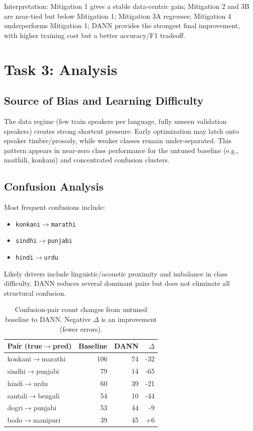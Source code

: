 \documentclass[11pt]{article}
\begin{document}
Interpretation: Mitigation 1 gives a stable data-centric gain; Mitigation 2 and 3B are near-tied but below Mitigation 1; Mitigation 3A regresses; Mitigation 4 underperforms Mitigation 1; DANN provides the strongest final improvement, with higher training cost but a better accuracy/F1 tradeoff.

\section{Task 3: Analysis}
\subsection{Source of Bias and Learning Difficulty}
The data regime (few train speakers per language, fully unseen validation speakers) creates strong shortcut pressure. Early optimization may latch onto speaker timbre/prosody, while weaker classes remain under-separated. This pattern appears in near-zero class performance for the untuned baseline (e.g., maithili, konkani) and concentrated confusion clusters.

\subsection{Confusion Analysis}
Most frequent confusions include:
\begin{itemize}
    \item \texttt{konkani$\rightarrow$marathi}
    \item \texttt{sindhi$\rightarrow$punjabi}
    \item \texttt{hindi$\rightarrow$urdu}
\end{itemize}
Likely drivers include linguistic/acoustic proximity and imbalance in class difficulty. DANN reduces several dominant pairs but does not eliminate all structural confusion.

\begin{table}[t]
\centering
\small
\setlength{\tabcolsep}{3pt}
\begin{tabular}{@{}p{}rrr@{}}
\toprule
Pair (true$\rightarrow$pred) & Baseline & DANN & $\Delta$ \\
\midrule
konkani$\rightarrow$marathi & 106 & 74 & -32 \\
sindhi$\rightarrow$punjabi & 79 & 14 & -65 \\
hindi$\rightarrow$urdu & 60 & 39 & -21 \\
santali$\rightarrow$bengali & 54 & 10 & -44 \\
dogri$\rightarrow$punjabi & 53 & 44 & -9 \\
\midrule
bodo$\rightarrow$manipuri & 39 & 45 & +6 \\
\bottomrule
\end{tabular}
\caption{Confusion-pair count changes from untuned baseline to DANN. Negative $\Delta$ is an improvement (fewer errors).}
\label{tab:confusion-delta}
\end{table}
\end{document}
